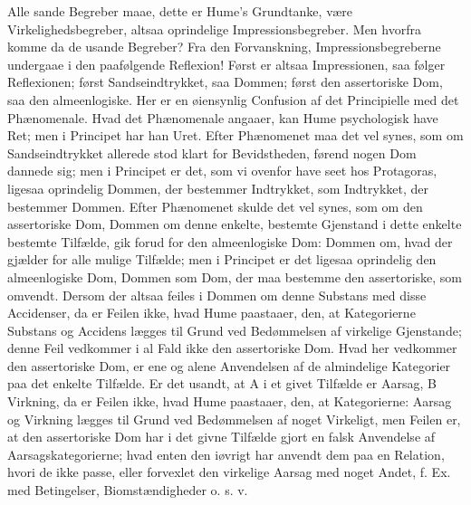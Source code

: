 \documentclass[12pt]{book}
\newcommand{\opage}[1]{\marginnote{\footnotesize\textit{[#1]}}}
\begin{document}
Alle sande Begreber maae, dette er Hume's Grundtanke,
være Virkelighedsbegreber, altsaa oprindelige Impressionsbegreber.
Men hvorfra komme da de usande Begreber? Fra
den Forvanskning, Impressionsbegreberne undergaae i den
paa\opage{188}følgende Reflexion! Først er altsaa Impressionen, saa følger
Reflexionen; først Sandseindtrykket, saa Dommen; først den
assertoriske Dom, saa den almeenlogiske. Her er en øiensynlig
Confusion af det Principielle med det Phænomenale. Hvad det
Phænomenale angaaer, kan Hume psychologisk have Ret; men i
Principet har han Uret. Efter Phænomenet maa det vel
synes, som om Sandseindtrykket allerede stod klart for Bevidstheden,
førend nogen Dom dannede sig; men i Principet er
det, som vi ovenfor have seet hos Protagoras, ligesaa oprindelig
Dommen, der bestemmer Indtrykket, som Indtrykket, der bestemmer
Dommen. Efter Phænomenet skulde det vel synes,
som om den assertoriske Dom, Dommen om denne enkelte,
bestemte Gjenstand i dette enkelte bestemte Tilfælde, gik forud
for den almeenlogiske Dom: Dommen om, hvad der gjælder
for alle mulige Tilfælde; men i Principet er det ligesaa oprindelig
den almeenlogiske Dom, Dommen som Dom, der
maa bestemme den assertoriske, som omvendt. Dersom der
altsaa feiles i Dommen om denne Substans med disse Accidenser,
da er Feilen ikke, hvad Hume paastaaer, den, at
Kategorierne Substans og Accidens lægges til Grund ved
Bedømmelsen af virkelige Gjenstande; denne Feil vedkommer i
al Fald ikke den assertoriske Dom. Hvad her vedkommer den
assertoriske Dom, er ene og alene Anvendelsen af de almindelige
Kategorier paa det enkelte Tilfælde. Er det usandt,
at A i et givet Tilfælde er Aarsag, B Virkning, da er
Feilen ikke, hvad Hume paastaaer, den, at Kategorierne: Aarsag
og Virkning lægges til Grund ved Bedømmelsen af noget
Virkeligt, men Feilen er, at den assertoriske Dom har i det
givne Tilfælde gjort en falsk Anvendelse af Aarsagskategorierne;
hvad enten den iøvrigt har anvendt dem paa en Relation,
hvori de ikke passe, eller forvexlet den virkelige Aarsag med
noget Andet, f. Ex. med Betingelser, Biomstændigheder o. s. v.
\end{document}
